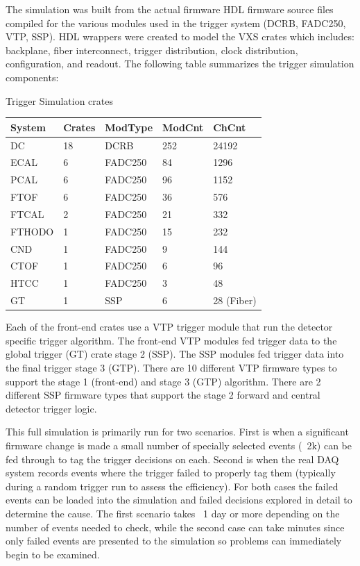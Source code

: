 The simulation was built from the actual firmware HDL firmware source files compiled for the various modules used in the trigger system (DCRB, FADC250, VTP, SSP). HDL wrappers were created to model the VXS crates which includes: backplane, fiber interconnect, trigger distribution, clock distribution, configuration, and readout. The following table summarizes the trigger simulation components:

\begin{center}
	Trigger Simulation crates\\
	\begin{tabular}{| l | l | l | l | l |}
		\hline \hline
		System		& Crates	& ModType	& ModCnt	& ChCnt		\\
		\hline
		DC		& 18		& DCRB		& 252		& 24192		\\
		ECAL		& 6		& FADC250	& 84		& 1296	 	\\
		PCAL		& 6		& FADC250	& 96		& 1152	 	\\
		FTOF		& 6		& FADC250	& 36		& 576	 	\\
		FTCAL		& 2		& FADC250	& 21		& 332	 	\\
		FTHODO		& 1		& FADC250	& 15		& 232	 	\\
		CND		& 1		& FADC250	& 9		& 144	 	\\
		CTOF		& 1		& FADC250	& 6		& 96	 	\\
		HTCC		& 1		& FADC250	& 3		& 48	 	\\
		GT		& 1		& SSP		& 6		& 28 (Fiber)	\\
		\hline \hline
	\end{tabular}
\end{center}

Each of the front-end crates use a VTP trigger module that run the detector specific trigger algorithm. The front-end VTP modules fed trigger data to the global trigger (GT) crate stage 2 (SSP). The SSP modules fed trigger data into the final trigger stage 3 (GTP). There are 10 different VTP firmware types to support the stage 1 (front-end) and stage 3 (GTP) algorithm. There are 2 different SSP firmware types that support the stage 2 forward and central detector trigger logic.

This full simulation is primarily run for two scenarios. First is when a significant firmware change is made a small number of specially selected events (~2k) can be fed through to tag the trigger decisions on each. Second is when the real DAQ system records events where the trigger failed to properly tag them (typically during a random trigger run to assess the efficiency). For both cases the failed events can be loaded into the simulation and failed decisions explored in detail to determine the cause. The first scenario takes ~1 day or more depending on the number of events needed to check, while the second case can take minutes since only failed events are presented to the simulation so problems can immediately begin to be examined.